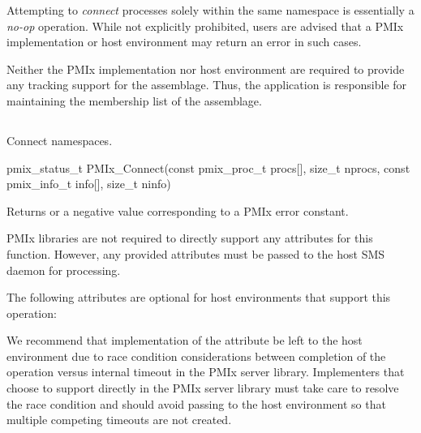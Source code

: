 \adviceuserstart
Attempting to \textit{connect} processes solely within the same namespace is essentially a \textit{no-op} operation. While not explicitly prohibited, users are advised that a \ac{PMIx} implementation or host environment may return an error in such cases.

Neither the \ac{PMIx} implementation nor host environment are required to provide any tracking support for the assemblage. Thus, the application is responsible for maintaining the membership list of the assemblage.
\adviceuserend


\subsection{}

\summary

Connect namespaces.

\format

\cspecificstart
\begin{codepar}
pmix_status_t
PMIx_Connect(const pmix_proc_t procs[], size_t nprocs,
             const pmix_info_t info[], size_t ninfo)
\end{codepar}
\cspecificend

\begin{arglist}
\end{arglist}

Returns  or a negative value corresponding to a PMIx error constant.

\reqattrstart
\ac{PMIx} libraries are not required to directly support any attributes for this function. However, any provided attributes must be passed to the host \ac{SMS} daemon for processing.

\reqattrend

\optattrstart
The following attributes are optional for host environments that support this operation:


\optattrend

\adviceimplstart
We recommend that implementation of the  attribute be left to the host environment due to race condition considerations between completion of the operation versus internal timeout in the \ac{PMIx} server library. Implementers that choose to support  directly in the \ac{PMIx} server library must take care to resolve the race condition and should avoid passing  to the host environment so that multiple competing timeouts are not created.
\adviceimplend

